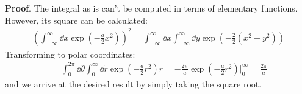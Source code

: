 \documentclass[../template.tex]{subfiles}
\begin{document}
\begin{expl}
    \textbf{Proof}. The integral as is can't be computed in terms of elementary functions. However, its square can be calculated:
    \begin{align*}
        \left(\int_{-\infty}^{\infty}\dd{x}  \exp\left(-\frac{a}{2}x^2 \right)\right)^2 =
        \int_{-\infty}^{\infty} \dd{x} \int_{-\infty}^{\infty} \dd{y} \exp \left(-\frac{2}{2} (x^2 + y^2) \right)
    \end{align*} 
    Transforming to polar coordinates:
    \begin{align*}
        = \int_0^{2\pi} \dd{\theta} \int_{0}^{\infty} \dd{r} \exp\left(-\frac{a}{2}r^2 \right) r = -\frac{2 \pi}{a} \exp\left(-\frac{a}{2}r^2 \right) \Big|_{0}^{\infty} = \frac{2 \pi}{a}  
    \end{align*}
    and we arrive at the desired result by simply taking the square root.
\end{expl}
\end{document}
